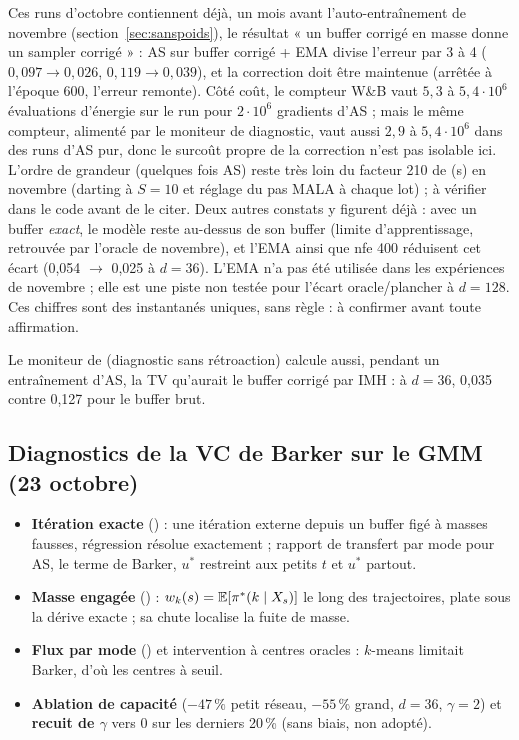 \begin{remark}
Ces runs d'octobre contiennent déjà, un mois avant l'auto-entraînement de novembre (section~\ref{sec:sanspoids}), le résultat « un buffer corrigé en masse donne un sampler corrigé » : AS sur buffer corrigé + EMA divise l'erreur par 3 à 4 ($0{,}097\to0{,}026$, $0{,}119\to0{,}039$), et la correction doit être maintenue (arrêtée à l'époque 600, l'erreur remonte). Côté coût, le compteur W\&B  vaut $5{,}3$ à $5{,}4\cdot10^6$ évaluations d'énergie sur le run pour $2\cdot10^6$ gradients d'AS ; mais le même compteur, alimenté par le moniteur de diagnostic, vaut aussi $2{,}9$ à $5{,}4\cdot10^6$ dans des runs d'AS pur, donc le surcoût propre de la correction n'est pas isolable ici. L'ordre de grandeur (quelques fois AS) reste très loin du facteur 210 de (s) en novembre (darting à $S=10$ et réglage du pas MALA à chaque lot) ; à vérifier dans le code avant de le citer. Deux autres constats y figurent déjà : avec un buffer \emph{exact}, le modèle reste au-dessus de son buffer (limite d'apprentissage, retrouvée par l'oracle de novembre), et l'EMA ainsi que nfe 400 réduisent cet écart (0,054 $\to$ 0,025 à $d=36$). L'EMA n'a pas été utilisée dans les expériences de novembre ; elle est une piste non testée pour l'écart oracle/plancher à $d=128$. Ces chiffres sont des instantanés uniques, sans règle : à confirmer avant toute affirmation.
\end{remark}
Le moniteur  de  (diagnostic sans rétroaction) calcule aussi, pendant un entraînement d'AS, la TV qu'aurait le buffer corrigé par IMH : à $d=36$, 0,035 contre 0,127 pour le buffer brut.

\subsection{Diagnostics de la VC de Barker sur le GMM (23 octobre)}
\begin{itemize}
  \item \textbf{Itération exacte} () : une itération externe depuis un buffer figé à masses fausses, régression résolue exactement ; rapport de transfert par mode pour AS, le terme de Barker, $u^*$ restreint aux petits $t$ et $u^*$ partout.
  \item \textbf{Masse engagée} () : $w_k(s)=\mathbb{E}[\pi^*(k\mid X_s)]$ le long des trajectoires, plate sous la dérive exacte ; sa chute localise la fuite de masse.
  \item \textbf{Flux par mode} () et intervention à centres oracles : $k$-means limitait Barker, d'où les centres à seuil.
  \item \textbf{Ablation de capacité} ($-47\,\%$ petit réseau, $-55\,\%$ grand, $d=36$, $\gamma=2$) et \textbf{recuit de $\gamma$} vers 0 sur les derniers 20\,\% (sans biais, non adopté).
\end{itemize}

